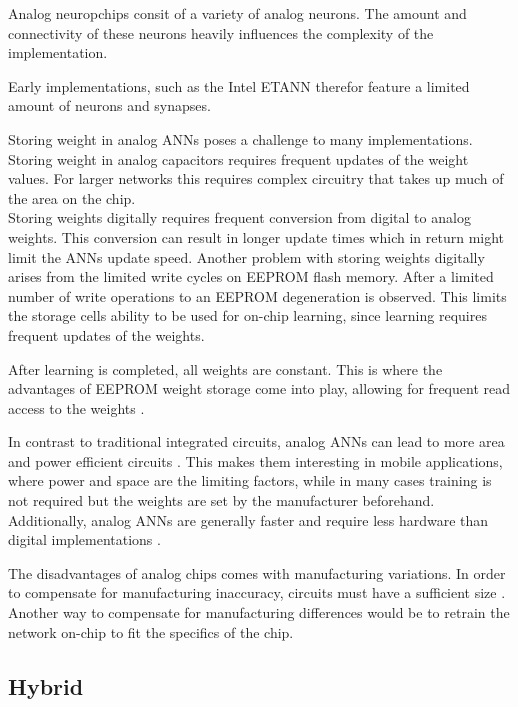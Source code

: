 \documentclass[conference]{IEEEtran}
\begin{document}
    Analog neuropchips consit of a variety of analog neurons.
    The amount and connectivity of these neurons heavily influences the complexity of the implementation.

    Early implementations, such as the Intel ETANN therefor feature a limited amount of neurons and synapses.

    Storing weight in analog ANNs poses a challenge to many implementations.
    Storing weight in analog capacitors requires frequent updates of the weight values.
    For larger networks this requires complex circuitry that takes up much of the area on the chip.
    \\
    Storing weights digitally requires frequent conversion from digital to analog weights.
    This conversion can result in longer update times which in return might limit the ANNs update speed.
    Another problem with storing weights digitally arises from the limited write cycles on EEPROM flash memory.
    After a limited number of write operations to an EEPROM degeneration is observed.
    This limits the storage cells ability to be used for on-chip learning, since learning requires frequent updates of the weights.

    After learning is completed, all weights are constant.
    This is where the advantages of EEPROM weight storage come into play, allowing for frequent read access to the weights \cite{holler1989electrically}.


    In contrast to traditional integrated circuits, analog ANNs can lead to more area and power efficient circuits \cite{forssell2014hardware}.
    This makes them interesting in mobile applications, where power and space are the limiting factors, while in many cases training is not required but the weights are set by the manufacturer beforehand.
    Additionally, analog ANNs are generally faster and require less hardware than digital implementations \cite{hollis1990artificial}.

    The disadvantages of analog chips comes with manufacturing variations.
    In order to compensate for manufacturing inaccuracy, circuits must have a sufficient size \cite{forssell2014hardware}.
    Another way to compensate for manufacturing differences would be to retrain the network on-chip to fit the specifics of the chip.

    \subsection{Hybrid}
\end{document}
